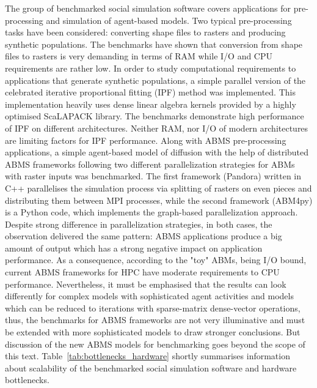The group of benchmarked social simulation software covers applications for pre-processing and simulation of agent-based models. Two typical pre-processing tasks have been considered: converting shape files to rasters and producing synthetic populations. The benchmarks have shown that conversion from shape files to rasters is very demanding in terms of RAM while I/O and CPU requirements are rather low. In order to study computational requirements to applications that generate synthetic populations, a simple parallel version of the celebrated iterative proportional fitting (IPF) method was implemented. This implementation heavily uses dense linear algebra kernels provided by a highly optimised ScaLAPACK library. The benchmarks demonstrate high performance of IPF on different architectures. Neither RAM, nor I/O of modern architectures are limiting factors for IPF performance. Along with ABMS pre-processing applications, a simple agent-based model of diffusion with the help of distributed ABMS frameworks following two different parallelization strategies for ABMs with raster inputs was benchmarked. The first framework (Pandora) written in C++ parallelises the simulation process via splitting of rasters on even pieces and distributing them between MPI processes, while the second framework (ABM4py) is a Python code, which implements the graph-based parallelization approach. Despite strong difference in parallelization strategies, in both cases, the observation delivered the same pattern: ABMS applications produce a big amount of output which has a strong negative impact on application performance. As a consequence, according to the "toy" ABMs, being I/O bound, current ABMS frameworks for HPC have moderate requirements to CPU performance. Nevertheless, it must be emphasised that the results can look differently for complex models with sophisticated agent activities and models which can be reduced to iterations with sparse-matrix dense-vector operations, thus, the benchmarks for ABMS frameworks are not very illuminative and must be extended with more sophisticated models to draw stronger conclusions. But discussion of the new ABMS models for benchmarking goes beyond the scope of this text. Table~\ref{tab:bottlenecks_hardware} shortly summarises information about scalability of the benchmarked social simulation software and hardware bottlenecks.



